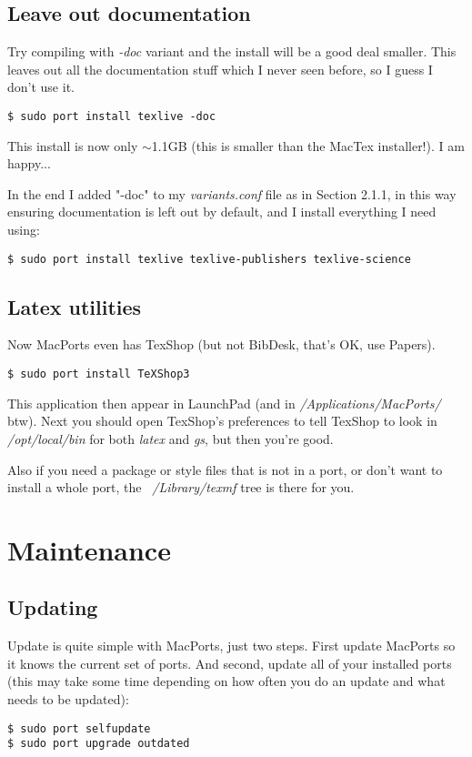 \documentclass[11pt, A4paper]{article}
\begin{document}
\subsection{Leave out documentation}
Try compiling with \textit{-doc} variant and the install will be a good deal smaller. This leaves out all the documentation stuff which I never seen before, so I guess I don't use it.
\begin{lstlisting}[style=Bash]
$ sudo port install texlive -doc
\end{lstlisting}
This install is now only $\sim$1.1GB (this is smaller than the MacTex installer!). I am happy...

In the end I added "-doc" to my {\it variants.conf} file as in Section 2.1.1, in this way ensuring documentation is left out by default, and I install everything I need using:
\begin{lstlisting}[style=Bash]
$ sudo port install texlive texlive-publishers texlive-science 
\end{lstlisting}

\subsection{Latex utilities}
Now MacPorts even has TexShop (but not BibDesk, that's OK, use Papers). 
\begin{lstlisting}[style=Bash]
$ sudo port install TeXShop3
\end{lstlisting}
This application then appear in LaunchPad (and in \textit{/Applications/MacPorts/} btw). Next you should open TexShop's preferences to tell TexShop to look in \textit{/opt/local/bin} for both \textit{latex} and \textit{gs}, but then you're good. 

Also if you need a package or style files that is not in a port, or don't want to install a whole port, the \textit{~/Library/texmf} tree is there for you.



%
%
\section{Maintenance}

\subsection{Updating}
Update is quite simple with MacPorts, just two steps. First update MacPorts so it knows the current set of ports. And second, update all of your installed ports (this may take some time depending on how often you do an update and what needs to be updated):
\begin{lstlisting}[style=Bash]
$ sudo port selfupdate
$ sudo port upgrade outdated
\end{lstlisting}
\end{document}
